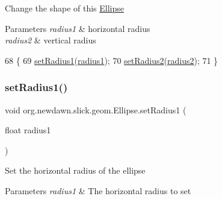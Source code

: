 Change the shape of this \mbox{\hyperlink{classorg_1_1newdawn_1_1slick_1_1geom_1_1_ellipse}{Ellipse}}


\begin{DoxyParams}{Parameters}
{\em radius1} & horizontal radius \\
\hline
{\em radius2} & vertical radius \\
\hline
\end{DoxyParams}

\begin{DoxyCode}
68                                                        \{
69         \mbox{\hyperlink{classorg_1_1newdawn_1_1slick_1_1geom_1_1_ellipse_a8e211ec08a413249489a6855c7eb850b}{setRadius1}}(\mbox{\hyperlink{classorg_1_1newdawn_1_1slick_1_1geom_1_1_ellipse_a26f6d13c3b22a475bc1caf33f84a24b9}{radius1}});
70         \mbox{\hyperlink{classorg_1_1newdawn_1_1slick_1_1geom_1_1_ellipse_ac172de7810cab47810a23c6661515e89}{setRadius2}}(\mbox{\hyperlink{classorg_1_1newdawn_1_1slick_1_1geom_1_1_ellipse_ad3152cb17acd020ac3ae7bf70526ae9f}{radius2}});
71     \}
\end{DoxyCode}
\mbox{\label{classorg_1_1newdawn_1_1slick_1_1geom_1_1_ellipse_a8e211ec08a413249489a6855c7eb850b}} 
\subsubsection{\texorpdfstring{set\+Radius1()}{setRadius1()}}
{\footnotesize\ttfamily void org.\+newdawn.\+slick.\+geom.\+Ellipse.\+set\+Radius1 (\begin{DoxyParamCaption}\item[{float}]{radius1 }\end{DoxyParamCaption})\hspace{0.3cm}{\ttfamily [inline]}}

Set the horizontal radius of the ellipse


\begin{DoxyParams}{Parameters}
{\em radius1} & The horizontal radius to set \\
\hline
\end{DoxyParams}

